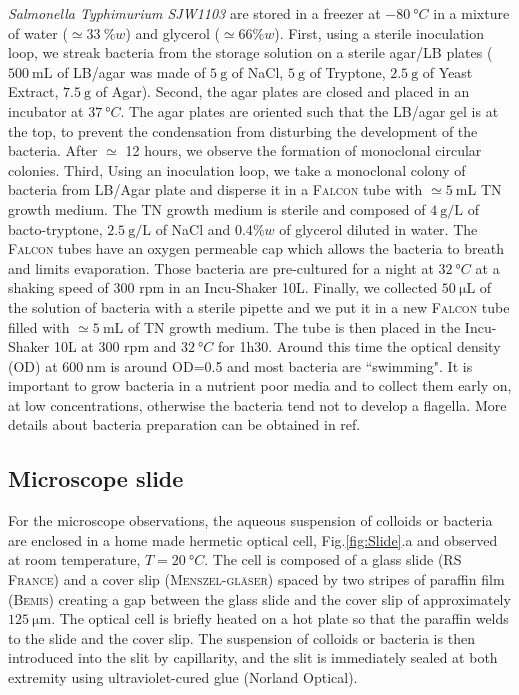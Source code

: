 \documentclass[prb,twocolumn,amsmath,amssymb]{revtex4-1}
\begin{document}
\textit{Salmonella Typhimurium SJW1103}  are stored in a freezer at $\SI{-80}{\degree C}$ in a mixture of water ($\simeq \SI{33}{\%} w$) and glycerol ($\simeq 66\% w$). First, using a sterile inoculation loop, we streak bacteria from the storage solution on a sterile agar/LB plates  ($\SI{500}{\milli\liter}$ of LB/agar was made of $\SI{5}{\gram}$ of NaCl, $\SI{5}{\gram}$ of Tryptone, $\SI{2.5}{\gram}$ of Yeast Extract, $\SI{7.5}{\gram}$ of Agar). Second, the agar plates are closed and placed in an incubator at $\SI{37}{\degree C}$. The agar plates are oriented such that the LB/agar gel is at the top, to prevent the condensation from disturbing the development of the bacteria. After $\simeq$ 12 hours, we observe the formation of monoclonal circular colonies. Third, Using an inoculation loop, we take a monoclonal colony of bacteria from LB/Agar plate and disperse it in a \textsc{Falcon} tube with $\simeq \SI{5}{\milli\liter}$ TN growth medium. The TN growth medium is sterile and composed of $\SI{4}{\gram\per\liter}$ of bacto-tryptone, $\SI{2.5}{\gram\per\liter}$ of NaCl and $0.4\% w$ of glycerol diluted in water. The \textsc{Falcon} tubes have an oxygen permeable cap which allows the bacteria to breath and limits evaporation. Those bacteria are pre-cultured for a night at $\SI{32}{\degree C}$ at a shaking speed of 300 rpm in an Incu-Shaker 10L. Finally, we collected $\SI{50}{\micro\liter}$ of the solution of bacteria with a sterile pipette and we put it in a new \textsc{Falcon} tube filled with $\simeq \SI{5}{\milli\liter}$ of TN growth medium. The tube is then placed in the Incu-Shaker 10L at 300 rpm and $\SI{32}{\degree C}$ for 1h30. Around this time the optical density (OD) at $\SI{600}{\nano\meter}$ is around OD=0.5 and most bacteria are ``swimming". It is important to grow bacteria in a nutrient poor media and to collect them early on, at low concentrations, otherwise the bacteria tend not to develop a flagella. More details about bacteria preparation can be obtained in ref\cite{Schwarz2015, ajp2010hagen}.

\subsection{Microscope slide}
For the microscope observations, the aqueous suspension of colloids or bacteria are enclosed in a home made hermetic optical cell, Fig.\ref{fig:Slide}.a and observed at room temperature, $T=\SI{20}{\degree C}$. The cell is composed of a  glass slide (\textsc{RS France}) and a cover slip (\textsc{Menszel-gl\"aser}) spaced by two stripes of paraffin film (\textsc{Bemis}) creating a gap between the glass slide and the cover slip of approximately $\SI{125}{\micro\meter}$. The optical cell is briefly heated on a hot plate so that the paraffin welds to the slide and the cover slip. The suspension of colloids or bacteria is then introduced into the slit by capillarity, and the slit is immediately sealed at both extremity using ultraviolet-cured glue (Norland Optical).
\end{document}
